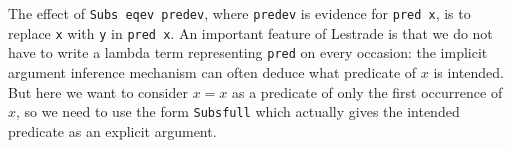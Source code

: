 \documentclass{slides}
\begin{document}
\begin{slide}
{\begin{verbatim}
\end{verbatim}

}


The effect of {\tt Subs eqev predev}, where {\tt predev} is evidence for {\tt pred x}, is to replace {\tt x} with {\tt y} in {\tt pred x}.
An important feature of Lestrade is that we do not have to write a lambda term representing {\tt pred} on every occasion:  the implicit argument inference
mechanism can often deduce what predicate of $x$ is intended.  But here we want to consider $x=x$ as a predicate of only the first occurrence of $x$,
so we need to use the form {\tt Subsfull} which actually gives the intended predicate as an explicit argument.



\end{slide}
\end{document}
